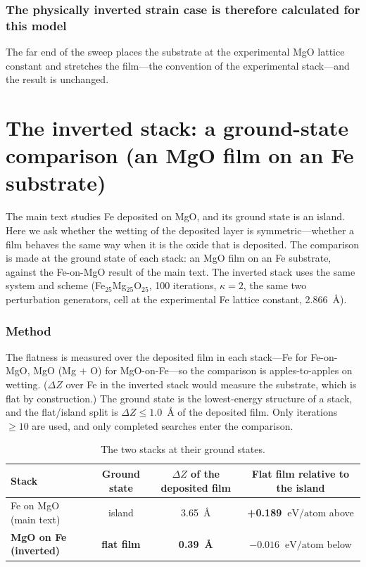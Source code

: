 \documentclass[10pt]{article}
\newcommand{\dZ}{\ensuremath{\Delta Z}}
\newcommand{\eVA}{\ensuremath{\text{eV/atom}}}
\begin{document}
\subsubsection{The physically inverted strain case is therefore calculated for this model} The far end of
the sweep places the substrate at the experimental MgO lattice constant and stretches the
film---the convention of the experimental stack---and the result is unchanged.

\section{The inverted stack: a ground-state comparison (an MgO film on an Fe substrate)}
\label{sec:S6}

The main text studies Fe deposited on MgO, and its ground state is an island. Here we ask whether the
wetting of the deposited layer is symmetric---whether a film behaves the same way when it is
the oxide that is deposited. The comparison is made at the ground state of each stack: an
MgO film on an Fe substrate, against the Fe-on-MgO result of the main text. The inverted
stack uses the same system and scheme (Fe$_{25}$Mg$_{25}$O$_{25}$, 100 iterations, $\kappa = 2$, the
same two perturbation generators, cell at the experimental Fe lattice constant, 2.866~\AA).

\subsubsection{Method} The flatness is measured over the deposited film in each stack---Fe for
Fe-on-MgO, MgO (Mg $+$ O) for MgO-on-Fe---so the comparison is apples-to-apples on wetting. ($\dZ$
over Fe in the inverted stack would measure the substrate, which is flat by construction.) The ground
state is the lowest-energy structure of a stack, and the flat/island split is $\dZ \le 1.0$~\AA{} of
the deposited film. Only iterations $\ge 10$ are used, and only completed searches enter the
comparison.

\begin{table}[t]
\small
\caption{\label{tab:S6}The two stacks at their ground states.}
\begin{tabular*}{\textwidth}{@{\extracolsep{\fill}}lccc}
\toprule
Stack & Ground state & $\dZ$ of the deposited film & Flat film relative to the island \\
\midrule
Fe on MgO (main text) & island & 3.65~\AA & \textbf{+0.189~\eVA} above \\
\textbf{MgO on Fe (inverted)} & \textbf{flat film} & \textbf{0.39~\AA} & \textbf{$-0.016$~\eVA} below \\
\bottomrule
\end{tabular*}
\end{table}
\end{document}
